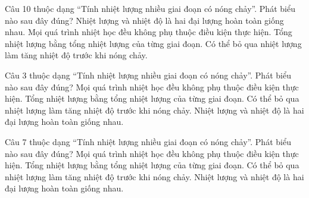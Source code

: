 
\begin{ex}
Câu 10 thuộc dạng “Tính nhiệt lượng nhiều giai đoạn có nóng chảy”. Phát biểu nào sau đây đúng?
\choice
{Nhiệt lượng và nhiệt độ là hai đại lượng hoàn toàn giống nhau.}
{Mọi quá trình nhiệt học đều không phụ thuộc điều kiện thực hiện.}
{\True Tổng nhiệt lượng bằng tổng nhiệt lượng của từng giai đoạn.}
{Có thể bỏ qua nhiệt lượng làm tăng nhiệt độ trước khi nóng chảy.}
\end{ex}


\begin{ex}
Câu 3 thuộc dạng “Tính nhiệt lượng nhiều giai đoạn có nóng chảy”. Phát biểu nào sau đây đúng?
\choice
{Mọi quá trình nhiệt học đều không phụ thuộc điều kiện thực hiện.}
{\True Tổng nhiệt lượng bằng tổng nhiệt lượng của từng giai đoạn.}
{Có thể bỏ qua nhiệt lượng làm tăng nhiệt độ trước khi nóng chảy.}
{Nhiệt lượng và nhiệt độ là hai đại lượng hoàn toàn giống nhau.}
\end{ex}

\begin{ex}
Câu 7 thuộc dạng “Tính nhiệt lượng nhiều giai đoạn có nóng chảy”. Phát biểu nào sau đây đúng?
\choice
{Mọi quá trình nhiệt học đều không phụ thuộc điều kiện thực hiện.}
{\True Tổng nhiệt lượng bằng tổng nhiệt lượng của từng giai đoạn.}
{Có thể bỏ qua nhiệt lượng làm tăng nhiệt độ trước khi nóng chảy.}
{Nhiệt lượng và nhiệt độ là hai đại lượng hoàn toàn giống nhau.}
\end{ex}

